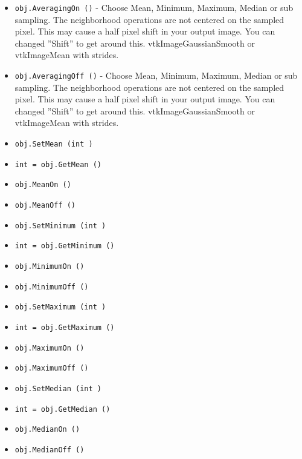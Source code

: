 \begin{itemize}
\item  \verb|obj.AveragingOn ()| -  Choose Mean, Minimum, Maximum, Median or sub sampling.
 The neighborhood operations are not centered on the sampled pixel.
 This may cause a half pixel shift in your output image.
 You can changed ''Shift'' to get around this.
 vtkImageGaussianSmooth or vtkImageMean with strides.

\item  \verb|obj.AveragingOff ()| -  Choose Mean, Minimum, Maximum, Median or sub sampling.
 The neighborhood operations are not centered on the sampled pixel.
 This may cause a half pixel shift in your output image.
 You can changed ''Shift'' to get around this.
 vtkImageGaussianSmooth or vtkImageMean with strides.

\item  \verb|obj.SetMean (int )|

\item  \verb|int = obj.GetMean ()|

\item  \verb|obj.MeanOn ()|

\item  \verb|obj.MeanOff ()|

\item  \verb|obj.SetMinimum (int )|

\item  \verb|int = obj.GetMinimum ()|

\item  \verb|obj.MinimumOn ()|

\item  \verb|obj.MinimumOff ()|

\item  \verb|obj.SetMaximum (int )|

\item  \verb|int = obj.GetMaximum ()|

\item  \verb|obj.MaximumOn ()|

\item  \verb|obj.MaximumOff ()|

\item  \verb|obj.SetMedian (int )|

\item  \verb|int = obj.GetMedian ()|

\item  \verb|obj.MedianOn ()|

\item  \verb|obj.MedianOff ()|

\end{itemize}
